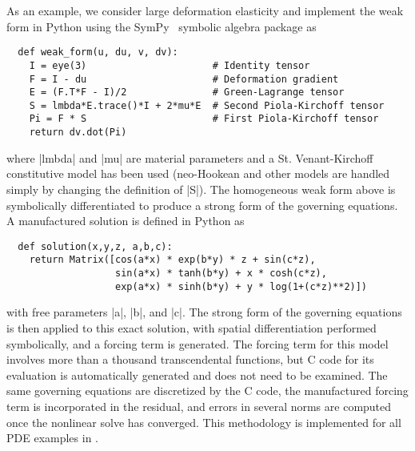 As an example, we consider large deformation elasticity and implement the weak form in Python using the SymPy~\cite{sympy-web-page} symbolic algebra package as
\begin{verbatim}
  def weak_form(u, du, v, dv):
    I = eye(3)                      # Identity tensor
    F = I - du                      # Deformation gradient
    E = (F.T*F - I)/2               # Green-Lagrange tensor
    S = lmbda*E.trace()*I + 2*mu*E  # Second Piola-Kirchoff tensor
    Pi = F * S                      # First Piola-Kirchoff tensor
    return dv.dot(Pi)
\end{verbatim}
where \pyverb|lmbda| and \pyverb|mu| are material parameters and a St. Venant-Kirchoff constitutive model has been used (neo-Hookean and other models are handled simply by changing the definition of \pyverb|S|).
The homogeneous weak form above is symbolically differentiated to produce a strong form of the governing equations.
A manufactured solution is defined in Python as
\begin{verbatim}
  def solution(x,y,z, a,b,c):
    return Matrix([cos(a*x) * exp(b*y) * z + sin(c*z),
                   sin(a*x) * tanh(b*y) + x * cosh(c*z),
                   exp(a*x) * sinh(b*y) + y * log(1+(c*z)**2)])
\end{verbatim}
with free parameters \pyverb|a|, \pyverb|b|, and \pyverb|c|.
The strong form of the governing equations is then applied to this exact solution, with spatial differentiation performed symbolically, and a forcing term is generated.
The forcing term for this model involves more than a thousand transcendental functions, but C code for its evaluation is automatically generated and does not need to be examined.
The same governing equations are discretized by the C code, the manufactured forcing term is incorporated in the residual, and errors in several norms are computed once the nonlinear solve has converged.
This methodology is implemented for all PDE examples in {\Dohp}.

